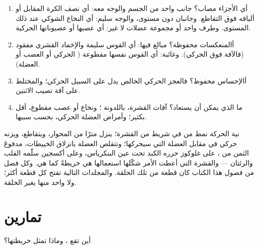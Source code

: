 \begin{method}\label{met:g12:brain-and-movement:locate}
\begin{enumerate}
  \item أي الأجزاء مصاب؟ جانب واحد من الجسم والوجه معه: أي نصف الكرة
        المقابل أو أليافه فوق التقاطع. وجانبان دون مستوى، والوجه سليم:
        أي النخاع الشوكي عند ذلك المستوى. وطرف واحد أو مجموعة عضلات لا
        غير: أي عصبها أو عصبوناتها الحركية.
  \item أالمنعكسات محفوظة؟ مبالغ فيها: أي القوس سليمة والإخماد القشري
        مفقود (فالآفة فوق  الحركي). وغائبة: أي القوس نفسها
        مقطوعة ( الحركي أو العصب أو العضلة).
  \item أالإحساس محفوظ؟ فالعجز الحركي الخالص يدل على السبيل الحركي؛
        والمختلط على آفة تصيب الاثنين.
  \item ما الذي يمكن أن يستعاد؟ آفات القشرة، باللدونة ؛ ونخاع
        أو عصب مقطوع، أقل بكثير؛ وأمراض العضلة  الحركي، بحسب
        سببها.
\end{enumerate}
\end{method}

\begin{remark}\label{rem:g12:brain-and-movement:loop}
نية الحركة نمط من  في شريط من القشرة؛ ينزل مترًا من
المحوار، ويتقاطع، ويزنه  حركي في مقابل  العضلة التي سيحركها؛
وتتقلص العضلة بانزلاق الخييطات، مدفوعَ الثمن من  ، على
غلوكوز حرره الكبد تحت عين البنكرياس، وعلى أكسجين سلّمه القلب
والرئتان --- والقشرة التي أعطت الأمر شكّلها استعمالها هي خريطةً كما هي.
وكل فصل من فصول هذا الكتاب كان قطعة من تلك الحلقة. والمجلدات التالية
تفتح كل قطعة أكثر؛ ولا واحد منها يغير الحلقة.
\end{remark}

\section{تمارين}

\begin{exercise}[$\star$]\label{exo:g12:brain-and-movement:1}
أين تقع ، وماذا تمثل خريطتها؟
\end{exercise}

